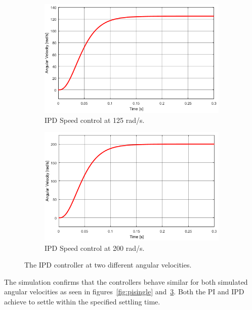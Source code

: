 \begin{figure}[h!]
	\centering
	\begin{subfigure}[b]{0.45\textwidth}
		\includegraphics[width=\textwidth]{graphics/IPD_single125}
		\caption{IPD Speed control at 125 rad/s.}
		\label{fig:ipdsingle125}
	\end{subfigure}
	\begin{subfigure}[b]{0.45\textwidth}
		\includegraphics[width=\textwidth]{graphics/IPD_single200}
		\caption{IPD Speed control at 200 rad/s.}
		\label{fig:ipdsingle200}
	\end{subfigure}
	\caption{The IPD controller at two different angular velocities.}\label{fig:ipdsingle}
\end{figure}

The simulation confirms that the controllers behave similar for both simulated angular velocities as seen in figures~\ref{fig:pisingle} and~\ref{fig:ipdsingle}. Both the PI and IPD achieve to settle within the specified settling time.

